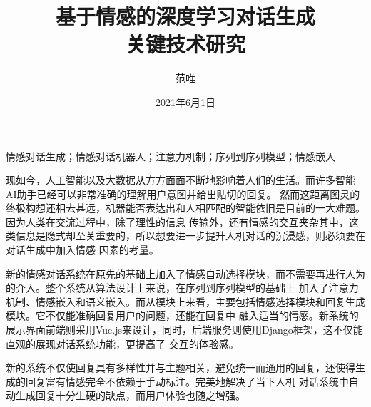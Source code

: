 \documentclass[supercite]{HustGraduPaper}
\title{基于情感的深度学习对话生成\\关键技术研究}
\author{范唯}
\date{2021年6月1日}
\theoremstyle{definition}
\begin{document}
\maketitle

\statement

\clearpage


\begin{cnabstract}{情感对话生成；情感对话机器人；注意力机制；序列到序列模型；情感嵌入}

现如今，人工智能以及大数据从方方面面不断地影响着人们的生活。而许多智能AI助手已经可以非常准确的理解用户意图并给出贴切的回复。
然而这距离图灵的终极构想还相去甚远，机器能否表达出和人相匹配的智能依旧是目前的一大难题。因为人类在交流过程中，除了理性的信息
传输外，还有情感的交互夹杂其中，这类信息是隐式却至关重要的，所以想要进一步提升人机对话的沉浸感，则必须要在对话生成中加入情感
因素的考量。

新的情感对话系统在原先的基础上加入了情感自动选择模块，而不需要再进行人为的介入。整个系统从算法设计上来说，在序列到序列模型的基础上
加入了注意力机制、情感嵌入和语义嵌入。而从模块上来看，主要包括情感选择模块和回复生成模块。它不仅能准确回复用户的问题，还能在回复中
融入适当的情感。新系统的展示界面前端则采用Vue.js来设计，同时，后端服务则使用Django框架，这不仅能直观的展现对话系统功能，更提高了
交互的体验感。

新的系统不仅使回复具有多样性并与主题相关，避免统一而通用的回复，还使得生成的回复富有情感完全不依赖于手动标注。完美地解决了当下人机
对话系统中自动生成回复十分生硬的缺点，而用户体验也随之增强。


\end{cnabstract}
\end{document}
